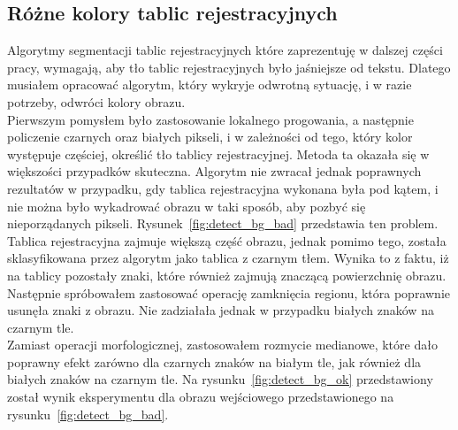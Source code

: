 \subsection{Różne kolory tablic rejestracyjnych}
Algorytmy segmentacji tablic rejestracyjnych które zaprezentuję w dalszej części pracy, wymagają, aby tło tablic rejestracyjnych było jaśniejsze od tekstu. Dlatego musiałem opracować algorytm, który wykryje odwrotną sytuację, i w razie potrzeby, odwróci kolory obrazu.\\
Pierwszym pomysłem było zastosowanie lokalnego progowania, a następnie policzenie czarnych oraz białych pikseli, i w zależności od tego, który kolor występuje częściej, określić tło tablicy rejestracyjnej. Metoda ta okazała się w większości przypadków skuteczna. Algorytm nie zwracał jednak poprawnych rezultatów w przypadku, gdy tablica rejestracyjna wykonana była pod kątem, i nie można było wykadrować obrazu w taki sposób, aby pozbyć się nieporządanych pikseli. Rysunek~\ref{fig:detect_bg_bad} przedstawia ten problem. Tablica rejestracyjna zajmuje większą część obrazu, jednak pomimo tego, została sklasyfikowana przez algorytm jako tablica z czarnym tłem. Wynika to z faktu, iż na tablicy pozostały znaki, które również zajmują znaczącą powierzchnię obrazu. Następnie spróbowałem zastosować operację zamknięcia regionu, która poprawnie usunęła znaki z obrazu. Nie zadziałała jednak w przypadku białych znaków na czarnym tle. \\
Zamiast operacji morfologicznej, zastosowałem rozmycie medianowe, które dało poprawny efekt zarówno dla czarnych znaków na białym tle, jak również dla białych znaków na czarnym tle. Na rysunku~\ref{fig:detect_bg_ok} przedstawiony został wynik eksperymentu dla obrazu wejściowego przedstawionego na rysunku~\ref{fig:detect_bg_bad}.

